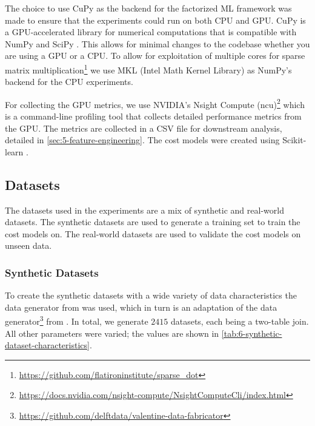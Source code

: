The choice to use CuPy as the backend for the factorized ML framework was made to ensure that the experiments could run on both CPU and GPU. CuPy is a GPU-accelerated library for numerical computations that is compatible with NumPy and SciPy \cite{cupy_learningsys2017}. This allows for minimal changes to the codebase whether you are using a GPU or a CPU. To allow for exploitation of multiple cores for sparse matrix multiplication\footnote{\url{https://github.com/flatironinstitute/sparse_dot}} we use MKL (Intel Math Kernel Library) \cite{intel-mkl} as NumPy's backend for the CPU experiments.

For collecting the GPU metrics, we use NVIDIA's Nsight Compute (ncu)\footnote{\url{https://docs.nvidia.com/nsight-compute/NsightComputeCli/index.html}} which is a command-line profiling tool that collects detailed performance metrics from the GPU. The metrics are collected in a CSV file for downstream analysis, detailed in \autoref{sec:5-feature-engineering}. The cost models were created using Scikit-learn \cite{scikit-learn}.

\subsection{Datasets}
\label{subsec:6-datasets}
The datasets used in the experiments are a mix of synthetic and real-world datasets. The synthetic datasets are used to generate a training set to train the cost models on. The real-world datasets are used to validate the cost models on unseen data.

\subsubsection{Synthetic Datasets}
To create the synthetic datasets with a wide variety of data characteristics the data generator from \cite{schijndel_cost_estimation} was used, which in turn is an adaptation of the data generator\footnote{\url{https://github.com/delftdata/valentine-data-fabricator}} from \cite{valentine-data-generator}. In total, we generate $2415$ datasets, each being a two-table join. All other parameters were varied; the values are shown in \autoref{tab:6-synthetic-dataset-characteristics}.

